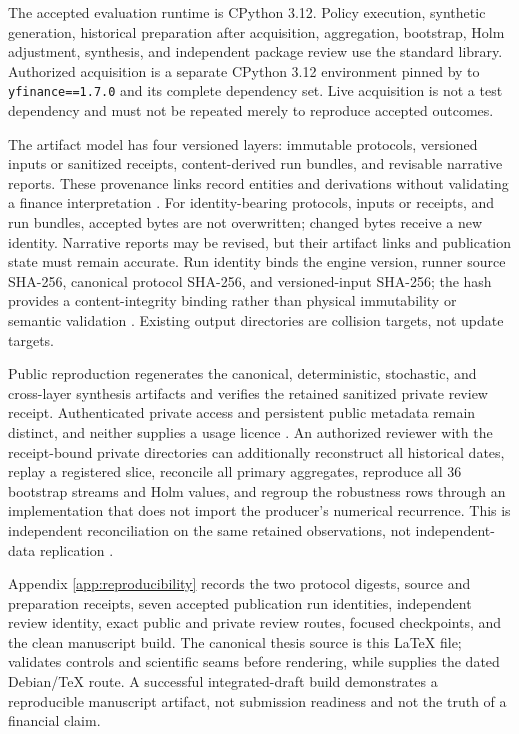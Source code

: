 \documentclass[12pt,a4paper,oneside]{report}
\begin{document}
The accepted evaluation runtime is CPython 3.12. Policy execution, synthetic
generation, historical preparation after acquisition, aggregation,
bootstrap, Holm adjustment, synthesis, and independent package review use the
standard library. Authorized acquisition is a separate CPython 3.12
environment pinned by  to
\texttt{yfinance==1.7.0} and its complete dependency set. Live acquisition is
not a test dependency and must not be repeated merely to reproduce accepted
outcomes.

The artifact model has four versioned layers: immutable protocols, versioned
inputs or sanitized receipts, content-derived run bundles, and revisable
narrative reports. These provenance links record entities and derivations
without validating a finance interpretation \citep{moreaumissier2013prov}.
For identity-bearing protocols, inputs or receipts, and run bundles, accepted
bytes are not overwritten; changed bytes receive a new identity. Narrative
reports may be revised, but their artifact links and publication state must
remain accurate. Run identity binds the engine version, runner source SHA-256,
canonical protocol SHA-256, and versioned-input SHA-256; the hash provides a
content-integrity binding rather than physical immutability or semantic validation
\citep{farrell2013rfc6920}. Existing output directories are collision targets,
not update targets.

Public reproduction regenerates the canonical, deterministic, stochastic, and
cross-layer synthesis artifacts and verifies the retained sanitized private
review receipt. Authenticated private access and persistent public metadata
remain distinct, and neither supplies a usage licence
\citep{wilkinson2016fair}. An authorized reviewer with the receipt-bound
private directories can additionally reconstruct all historical dates, replay
a registered slice, reconcile all primary aggregates, reproduce all 36
bootstrap streams and Holm values, and regroup the robustness rows through an
implementation that does not import the producer's numerical recurrence.
This is independent reconciliation on the same retained observations, not
independent-data replication \citep{peng2011reproducible,nasem2019reproducibility}.

Appendix \ref{app:reproducibility} records the two protocol digests, source and
preparation receipts, seven accepted publication run identities, independent
review identity, exact public and private review routes, focused checkpoints,
and the clean manuscript build. The canonical thesis source is this LaTeX
file;  validates controls and scientific seams before
rendering, while  supplies the dated
Debian/TeX route. A successful integrated-draft build demonstrates a reproducible
manuscript artifact, not submission readiness and not the truth of a financial
claim.
\end{document}
